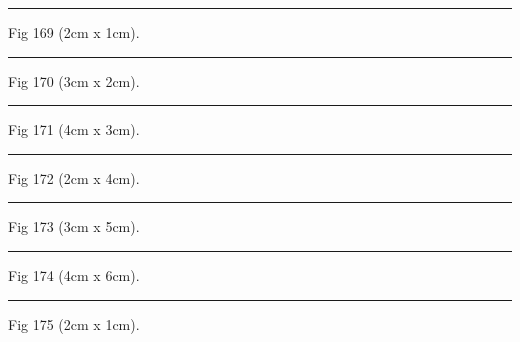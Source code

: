 \documentclass[a4paper,11pt]{article}
\begin{document}
\begin{swarmwrap}%
  \begin{minipage}[t]{2cm}
    \centering
    \rule{\linewidth}{1cm}
    {\footnotesize Fig 169 (2cm x 1cm).}
  \end{minipage}%
\end{swarmwrap}%
\swarmwrapnext
\lipsum[19]%

\begin{swarmwrap}%
  \begin{minipage}[t]{3cm}
    \centering
    \rule{\linewidth}{2cm}
    {\footnotesize Fig 170 (3cm x 2cm).}
  \end{minipage}%
\end{swarmwrap}%
\swarmwrapnext
\lipsum[20]%

\begin{swarmwrap}%
  \begin{minipage}[t]{4cm}
    \centering
    \rule{\linewidth}{3cm}
    {\footnotesize Fig 171 (4cm x 3cm).}
  \end{minipage}%
\end{swarmwrap}%
\swarmwrapnext
\lipsum[21]%

\begin{swarmwrap}%
  \begin{minipage}[t]{2cm}
    \centering
    \rule{\linewidth}{4cm}
    {\footnotesize Fig 172 (2cm x 4cm).}
  \end{minipage}%
\end{swarmwrap}%
\swarmwrapnext
\lipsum[22]%

\begin{swarmwrap}%
  \begin{minipage}[t]{3cm}
    \centering
    \rule{\linewidth}{5cm}
    {\footnotesize Fig 173 (3cm x 5cm).}
  \end{minipage}%
\end{swarmwrap}%
\swarmwrapnext
\lipsum[23]%

\begin{swarmwrap}%
  \begin{minipage}[t]{4cm}
    \centering
    \rule{\linewidth}{6cm}
    {\footnotesize Fig 174 (4cm x 6cm).}
  \end{minipage}%
\end{swarmwrap}%
\swarmwrapnext
\lipsum[24]%

\begin{swarmwrap}%
  \begin{minipage}[t]{2cm}
    \centering
    \rule{\linewidth}{1cm}
    {\footnotesize Fig 175 (2cm x 1cm).}
  \end{minipage}%
\end{swarmwrap}%
\swarmwrapnext
\lipsum[25]%
\end{document}
